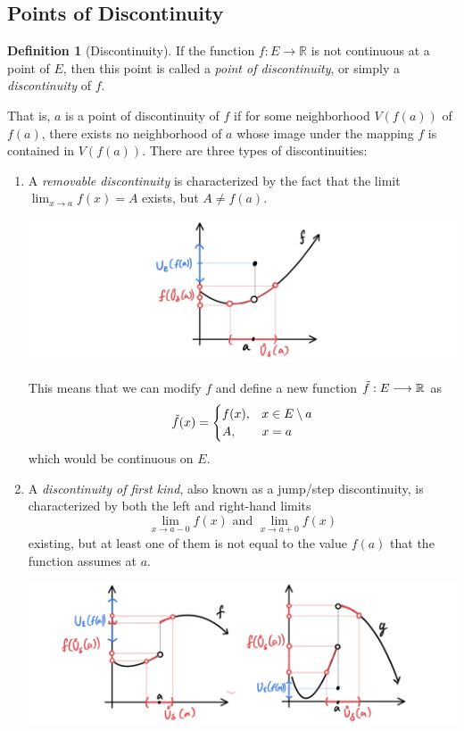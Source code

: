 \documentclass{article}
\theoremstyle{remark}
\theoremstyle{definition}
\newtheorem{definition}{Definition}[section]
\begin{document}
\subsection{Points of Discontinuity}
\begin{definition}[Discontinuity]
If the function $f: E \longrightarrow \mathbb{R}$ is not continuous at a point of $E$, then this point is called a \textit{point of discontinuity}, or simply a \textit{discontinuity} of $f$. 

That is, $a$ is a point of discontinuity of $f$ if for some neighborhood $V(f(a))$ of $f(a)$, there exists no neighborhood of $a$ whose image under the mapping $f$ is contained in $V(f(a))$. 
There are three types of discontinuities: 
\begin{enumerate}
    \item A \textit{removable discontinuity} is characterized by the fact that the limit $\lim_{x \rightarrow a} f(x) = A$ exists, but $A \neq f(a)$. \begin{center}
        \includegraphics[scale=0.28]{img/Removable_Discontinuity.PNG}
    \end{center}
    This means that we can modify $f$ and define a new function $\Tilde{f}: E \longrightarrow \mathbb{R}$ as
    \[\Tilde{f}(x) = \begin{cases}
    f(x), & x \in E \setminus a \\
    A, & x = a
    \end{cases}\]
    which would be continuous on $E$. 
    \item A \textit{discontinuity of first kind}, also known as a jump/step discontinuity, is characterized by both the left and right-hand limits 
    \[\lim_{x \rightarrow a-0} f(x) \text{ and } \lim_{x \rightarrow a+0} f(x)\]
    existing, but at least one of them is not equal to the value $f(a)$ that the function assumes at $a$. 
    \begin{center}
        \includegraphics[scale=0.28]{img/Discontinuity_First.PNG}

\end{center}
\end{enumerate}
\end{definition}
\end{document}
